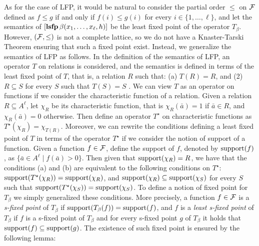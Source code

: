As for the case of LFP, it would be natural to consider the partial order $\leq$ on $\F$ defined as $f \leq g$ if and only if $f(i) \leq g(i)$ for every $i \in \{1, \ldots, \ell\}$, and let the semantics of $[{\bf lsfp} \, \beta(x_1,\ldots,x_\ell,h)]$ be the least fixed point of the operator $T_\beta$. However, $(\F, \leq)$ is not a complete lattice, so we do not have a Knaster-Tarski Theorem ensuring that such a fixed point exist. Instead, we generalize the semantics of LFP as follows. In the definition of the semantics of LFP, an operator $T$ on relations is considered, and the semantics is defined in terms of the least fixed point of $T$, that is, a relation $R$ such that: (a) $T(R) = R$, and (2) $R \subseteq S$ for every $S$ such that $T(S) = S$ \cite{I86,vardi1982complexity}.  We can view $T$ as an operator on functions if we consider the characteristic function of a relation. Given a relation $R \subseteq A^\ell$, let $\chi_R$ be its characteristic function, that is $\chi_R(\bar a) = 1$ if $\bar a \in R$, and $\chi_R(\bar a) = 0$ otherwise. Then define an operator $T^\star$ on characteristic functions as $T^\star(\chi_R) = \chi_{T(R)}$. Moreover, we can rewrite the conditions defining a least fixed point of $T$ in terms of the operator $T^\star$ if we consider the notion of support of a function. Given a function $f \in \F$, define the support of $f$, denoted by $\text{\rm support}(f)$, as $\{ \bar a \in A^\ell \mid f(\bar a) > 0 \}$. Then given that $\text{\rm support}(\chi_R) = R$, we have that the conditions (a) and (b) are equivalent to the following conditions on $T^\star$:
$\text{\rm support}(T^\star(\chi_R)) = \text{\rm support}(\chi_R)$, and $\text{\rm support}(\chi_R) \subseteq \text{\rm support}(\chi_S)$ for every $S$ such that  $\text{\rm support}(T^\star(\chi_{S})) = \text{\rm support}(\chi_S)$. 
To define a notion of fixed point for $T_\beta$ we simply generalized these conditions. More precisely, %
a function $f \in \F$ is a {\em s-fixed point} of $T_{\beta}$ if $\text{\rm support}(T_\beta(f)) = \text{\rm support}(f)$, and $f$ is a {\em least s-fixed point} of $T_{\beta}$ if $f$ is a s-fixed point of $T_\beta$ and for every s-fixed point $g$ of $T_\beta$ it holds that $\text{\rm support}(f) \subseteq \text{\rm support}(g)$. The existence of such fixed point is ensured by the following lemma:
